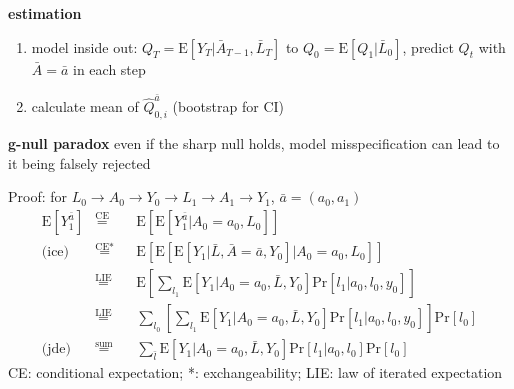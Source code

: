 \documentclass[8pt,twoside]{extarticle}
\begin{document}
\begin{multicols}{2}
{\begin{minipage}{28em}
\begin{mdframed}[linecolor=black!20!,
    outerlinewidth=0.2pt,
    innertopmargin=0.5\baselineskip,
    innerbottommargin=0.5\baselineskip,
    backgroundcolor=lightgray!20!white, innerleftmargin=2pt, innerrightmargin=2pt]
\textbf{estimation} \citep{schomaker_using_2019}

\begin{enumerate}[itemsep=0em, topsep=0pt, partopsep=0pt,parsep=0pt, leftmargin=1.5em]
\setlength{\itemsep}{0pt}%
\setlength{\parskip}{0pt}
\item model inside out: $Q_{T} {=} \mathrm{E} \left[Y_T| \bar{A}_{T{-}1}, \bar{L}_T \right]$ to $Q_0 {=} \mathrm{E} \left[Q_1| \bar{L}_0 \right]$, predict $Q_t$ with $\bar{A} = \bar{a}$ in each step
\item calculate mean of $\hat{Q}_{0,i}^{\bar{a}}$ (bootstrap for CI)
\end{enumerate}



\end{mdframed}

\noindent \textbf{g-null paradox} even if the sharp null holds, model misspecification can lead to it being falsely rejected

\end{minipage}}



\begin{mdframed}[style=MyFrame,nobreak=true, innerleftmargin=2pt, innerrightmargin=2pt]
Proof: for $L_0 \rightarrow A_0 \rightarrow Y_0 \rightarrow L_1 \rightarrow A_1 \rightarrow Y_1$, $\bar{a} =(a_0,a_1)$ 
\begin{alignat*}{4} 
\mathrm{E}\left[Y_1^{\bar{a}}\right] & \overset{\text{CE}}{=} && \mathrm{E}\left[\mathrm{E}\left[   Y_1^{\bar{a}}|A_0{=}a_0, L_0   \right]\right]  \\ 
\text{(ice)}\,\,\, &\overset{\text{CE*}}{=} && \mathrm{E}\left[\mathrm{E}\left[  \mathrm{E}\left[Y_1|\bar{L}, \bar{A}{=}\bar{a}, Y_0 \right]| A_0{=}a_0, L_0   \right]\right]  \\ 
&\overset{\text{LIE}}{=} && \mathrm{E}\left[ \sum\nolimits_{l_1} \mathrm{E}\left[Y_1|A_0{=}a_0, \bar{L}, Y_0\right] \mathrm{Pr}\left[l_1|a_0,l_0, y_0\right]         \right] \\
&\overset{\text{LIE}}{=} && \sum\nolimits_{l_0}\!\!\!\left[ \sum\nolimits_{l_1} \!\!\!\mathrm{E}\left[Y_1|A_0{=}a_0, \bar{L}, Y_0\right] \mathrm{Pr}\left[l_1|a_0,l_0, y_0\right]         \right] \mathrm{Pr}\left[l_0\right] \\
\text{(jde)}\,\,\, &\overset{\text{sum}}{=} &&  \sum\nolimits_{\bar{l}} \mathrm{E}\left[Y_1|A_0{=}a_0, \bar{L}, Y_0\right] \mathrm{Pr}\left[l_1|a_0,l_0\right]          \mathrm{Pr}\left[l_0\right] 
\end{alignat*}
CE: conditional expectation; *: exchangeability; \newline LIE: law of iterated expectation
\end{mdframed}








\end{multicols}
\end{document}
